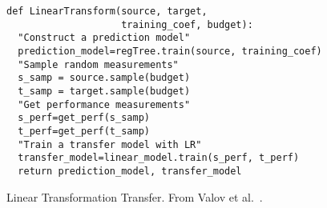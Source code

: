 \begin{figure}[t]
\small
\begin{lstlisting}[xrightmargin=6ex, mathescape,frame=none,numbers=right]
def LinearTransform(source, target, 
                    training_coef, budget): 
  "Construct a prediction model"
  prediction_model=regTree.train(source, training_coef)
  "Sample random measurements"
  s_samp = source.sample(budget)
  t_samp = target.sample(budget)
  "Get performance measurements"
  s_perf=get_perf(s_samp)
  t_perf=get_perf(t_samp)
  "Train a transfer model with LR"
  transfer_model=linear_model.train(s_perf, t_perf)
  return prediction_model, transfer_model
\end{lstlisting}
\caption{\small{Linear Transformation Transfer. From Valov et al.~\cite{valov2017transferring}.}}
\label{fig:lineartransform}  
\end{figure}